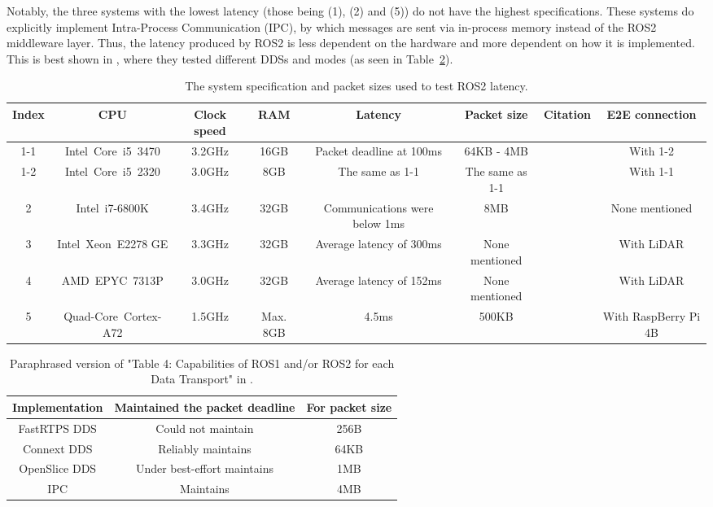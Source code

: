 \documentclass[conference,a4paper]{IEEEtran}
\begin{document}
Notably, the three systems with the lowest latency (those being (1), (2) and (5)) do not have the highest specifications.
These systems do explicitly implement \mbox{Intra-Process} Communication (IPC), by which messages are sent via \mbox{in-process} memory instead of the ROS2 middleware layer.
Thus, the latency produced by ROS2 is less dependent on the hardware and more dependent on how it is implemented.
This is best shown in \cite{Maruyama2016}, where they tested different DDSs and modes (as seen in Table~\ref{tab:dds_data_rates}).

\setlength{\parskip}{0em}
\setlength{\parindent}{0pt}
\begin{table}[!t]
	\centering
	\begin{tabular}{|c|c|c|c|c|c|c|c|}
		\toprule
			Index & CPU & Clock speed & RAM & Latency & Packet size & Citation & E2E connection \\
		\midrule
			1-1 & \mbox{Intel Core i5 3470} & 3.2GHz & 16GB & Packet deadline at 100ms & 64KB - 4MB & \cite{Maruyama2016} & With 1-2 \\
			1-2 & \mbox{Intel Core i5 2320} & 3.0GHz & 8GB & The same as 1-1 & The same as 1-1 & \cite{Maruyama2016} & With 1-1 \\
			2 & \mbox{Intel i7-6800K} & 3.4GHz & 32GB & Communications were below 1ms & 8MB & \cite{Macenski2022} & None mentioned \\
			3 & \mbox{Intel Xeon E2278} GE & 3.3GHz & 32GB & Average latency of 300ms & None mentioned & \cite{Betz2023Feb} & With LiDAR \\
			4 & \mbox{AMD EPYC 7313P} & 3.0GHz & 32GB & Average latency of 152ms & None mentioned & \cite{Betz2023Jun} & With LiDAR \\
			5 & \mbox{Quad-Core Cortex-A72} & 1.5GHz & Max. 8GB & 4.5ms & 500KB & \cite{Macenski2023} & With RaspBerry Pi 4B \\
		\bottomrule
	\end{tabular}
	\caption{The system specification and packet sizes used to test ROS2 latency.}
	\label{tab:system_specifications}
\end{table}

\setlength{\parskip}{0em}
\setlength{\parindent}{0pt}
\begin{table}[!t]
	\centering
	\begin{tabular}{|c|c|c|}
		\toprule
			Implementation & Maintained the packet deadline & For packet size \\
		\midrule
			FastRTPS DDS & Could not maintain & 256B \\
			Connext DDS & Reliably maintains & 64KB \\
			OpenSlice DDS & Under \mbox{best-effort} maintains & 1MB \\
			IPC & Maintains & 4MB \\
		\bottomrule
	\end{tabular}
	\caption{Paraphrased version of "Table 4: Capabilities of ROS1 and/or ROS2 for each Data Transport" in \cite{Maruyama2016}.}
	\label{tab:dds_data_rates}
\end{table}
\end{document}
